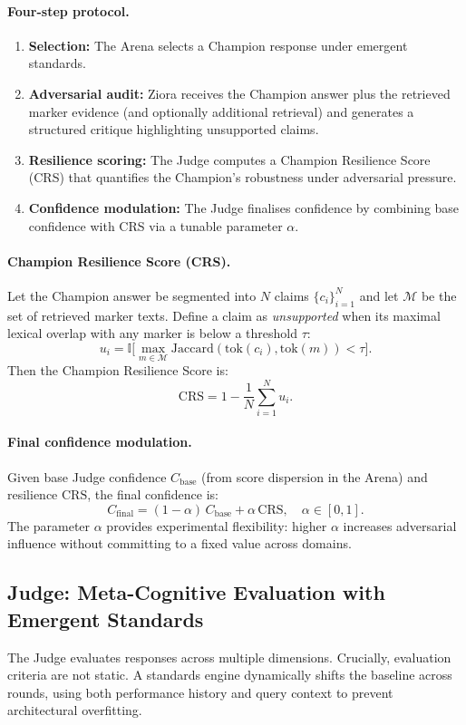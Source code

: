 \documentclass[11pt, a4paper]{article}
\begin{document}
\paragraph{Four-step protocol.}
\begin{enumerate}
  \item \textbf{Selection:} The Arena selects a Champion response under emergent standards.
  \item \textbf{Adversarial audit:} Ziora receives the Champion answer plus the retrieved marker evidence (and optionally additional retrieval) and generates a structured critique highlighting unsupported claims.
  \item \textbf{Resilience scoring:} The Judge computes a Champion Resilience Score (CRS) that quantifies the Champion's robustness under adversarial pressure.
  \item \textbf{Confidence modulation:} The Judge finalises confidence by combining base confidence with CRS via a tunable parameter $\alpha$.
\end{enumerate}

\paragraph{Champion Resilience Score (CRS).}
Let the Champion answer be segmented into $N$ claims $\{c_i\}_{i=1}^{N}$ and let $\mathcal{M}$ be the set of retrieved marker texts. Define a claim as \textit{unsupported} when its maximal lexical overlap with any marker is below a threshold $\tau$:
\[
u_i = \mathbb{I}\Big[\max_{m \in \mathcal{M}} \mathrm{Jaccard}(\mathrm{tok}(c_i), \mathrm{tok}(m)) < \tau\Big].
\]
Then the Champion Resilience Score is:
\[
\mathrm{CRS} = 1 - \frac{1}{N}\sum_{i=1}^{N} u_i.
\]

\paragraph{Final confidence modulation.}
Given base Judge confidence $C_{\mathrm{base}}$ (from score dispersion in the Arena) and resilience $\mathrm{CRS}$, the final confidence is:
\[
C_{\mathrm{final}} = (1-\alpha)\,C_{\mathrm{base}} + \alpha\,\mathrm{CRS}, \quad \alpha \in [0,1].
\]
The parameter $\alpha$ provides experimental flexibility: higher $\alpha$ increases adversarial influence without committing to a fixed value across domains.

\subsection{Judge: Meta-Cognitive Evaluation with Emergent Standards}
The Judge evaluates responses across multiple dimensions. Crucially, evaluation criteria are not static. A standards engine dynamically shifts the baseline across rounds, using both performance history and query context to prevent architectural overfitting.
\end{document}
